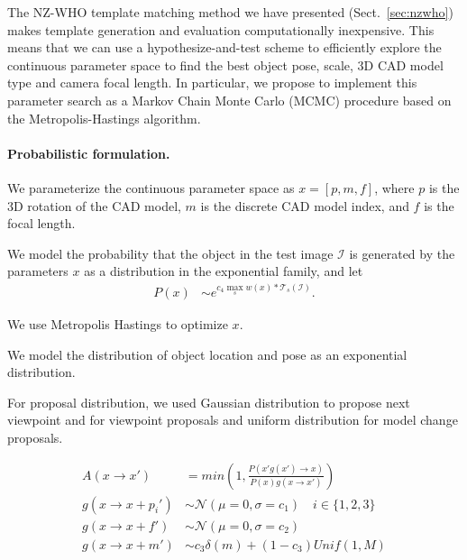 The NZ-WHO template matching method we have presented
(Sect.~\ref{sec:nzwho}) makes template generation and evaluation
computationally inexpensive. This means that we can use a
hypothesize-and-test scheme to efficiently explore the continuous
parameter space to find the best object pose, scale, 3D CAD model type
and camera focal length.
%
In particular, we propose to implement this parameter search as a
Markov Chain Monte Carlo (MCMC) procedure based on the
Metropolis-Hastings algorithm.

\paragraph{Probabilistic formulation.}
We parameterize the continuous parameter space as  $x = [p, m, f]$,
where $p$ is the 3D rotation of the CAD model, $m$ is the discrete CAD
model index, and $f$ is the focal length.

We model the probability that the object in the test image
$\mathcal{I}$ is generated by the parameters $x$ as a distribution in
the exponential family, and let
\begin{align}
    P(x) & \sim e^{ c_4 \max_{s} w(x) \ast \mathcal{T}_s(\mathcal{I})}.
\end{align}






We use Metropolis Hastings to optimize $x$.






We model the distribution of object location and pose as an exponential distribution. 

For proposal distribution, we used Gaussian distribution to propose next viewpoint and for viewpoint proposals
and uniform distribution for model change proposals.  


\begin{align}
    A(x \rightarrow x') & =  min\left( 1,  \frac{P(x' g(x') \rightarrow x)}{P(x) g(x \rightarrow x')}\right) \\
    g(x \rightarrow x + p_i') & \sim \mathcal{N}(\mu = 0,\sigma = c_1) \quad i \in \{1,2,3\}\\
    g(x \rightarrow x + f') & \sim \mathcal{N}(\mu = 0,\sigma = c_2)\\
    g(x \rightarrow x + m') & \sim c_3 \delta(m) + (1-c_3) Unif(1,M)
\end{align}


